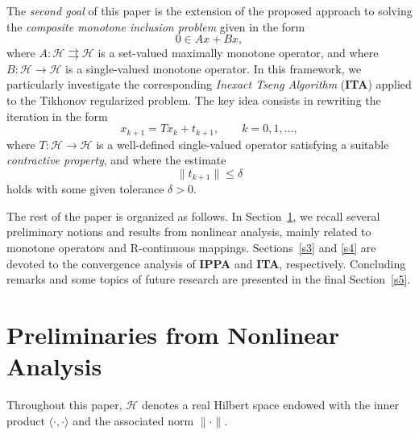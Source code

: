 \documentclass[12pt]{article}
\theoremstyle{plain}
\begin{document}
The {\it second goal} of this paper is the extension of the proposed approach to solving the {\it composite monotone inclusion problem} given in the form
\begin{equation*}\label{sumproblem}
0\in Ax+Bx,
\end{equation*}
where $A:\mathcal{H}\rightrightarrows \mathcal{H}$ is a set-valued  maximally monotone operator, and where $B:\mathcal{H}\to\mathcal{H}$ is a single-valued monotone operator. In this framework, we particularly investigate the corresponding {\it Inexact Tseng Algorithm} (\textbf{ITA}) applied to the Tikhonov regularized problem. The key idea consists in rewriting the iteration in the form
\begin{equation}\label{tseng}
x_{k+1}=Tx_k+t_{k+1},\qquad k=0,1,\ldots,
\end{equation}
where $T:\mathcal{H}\to\mathcal{H}$ is a well-defined single-valued operator satisfying a suitable {\it contractive property}, and where the estimate
\[
\|t_{k+1}\|\leq \delta
\]
holds with some given tolerance $\delta>0$.

The rest of the paper is organized as follows. In Section~\ref{s2}, we recall several preliminary notions and results from nonlinear analysis, mainly related to monotone operators and R-continuous mappings. Sections~\ref{s3} and \ref{s4} are devoted to the convergence analysis of \textbf{IPPA} and \textbf{ITA}, respectively. Concluding remarks and some topics of  {future research} are presented in the final Section~\ref{s5}.

\section{Preliminaries from Nonlinear Analysis}\label{s2}

Throughout this paper, $\mathcal{H}$ denotes a real Hilbert space endowed with the inner product $\langle \cdot,\cdot\rangle$ and the associated norm $\|\cdot\|$.
\end{document}
